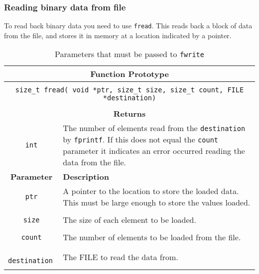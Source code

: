



\clearpage
\subsubsection{Reading binary data from file} %
\label{ssub:reading_binary_data_from_file}

To read back binary data you need to use \texttt{fread}. This reads back a block of data from the file, and stores it in memory at a location indicated by a pointer.

\begin{table}[h]
  \centering
  \begin{tabular}{|c|p{9cm}|}
    \hline
    \multicolumn{2}{|c|}{\textbf{Function Prototype}} \\
    \hline
    \multicolumn{2}{|c|}{} \\
    \multicolumn{2}{|c|}{\texttt{size\_t fread( void *ptr, size\_t size, size\_t count, FILE *destination)}} \\
    \multicolumn{2}{|c|}{} \\
    \hline
    \multicolumn{2}{|c|}{\textbf{Returns}} \\
    \hline
    \texttt{int} & The number of elements read from the \texttt{destination} by \texttt{fprintf}. If this does not equal the \texttt{count} parameter it indicates an error occurred reading the data from the file.\\
    \hline
    \textbf{Parameter} & \textbf{Description} \\
    \hline
    \texttt{ ptr } & A pointer to the location to store the loaded data. This must be large enough to store the values loaded.\\
    & \\
    \texttt{ size } & The size of each element to be loaded.\\
    & \\
    \texttt{ count } & The number of elements to be loaded from the file.\\
    & \\
    \texttt{ destination } & The FILE to read the data from.\\
    & \\
    \hline
  \end{tabular}
  \caption{Parameters that must be passed to \texttt{fwrite}}
  \label{tbl:fread}
\end{table}

